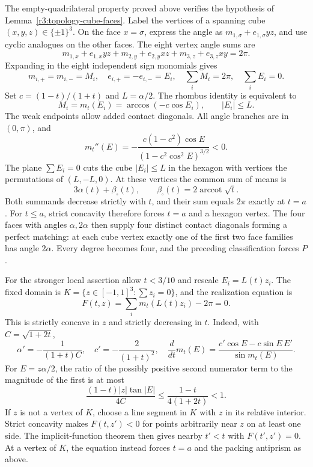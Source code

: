 \documentclass[12pt,reqno]{amsart}
\theoremstyle{definition}
\numberwithin{equation}{section}
\begin{document}
The empty-quadrilateral property proved above verifies the hypothesis
of Lemma~\ref{r3:topology-cube-faces}. Label the vertices of a spanning cube $(x,y,z)\in\{\pm1\}^3$. On the face
$x=\sigma$, express the angle as $m_{1,\sigma}+e_{1,\sigma}yz$, and use
cyclic analogues on the other faces. The eight vertex angle sums are
\[
 m_{1,x}+e_{1,x}yz+m_{2,y}+e_{2,y}xz+m_{3,z}+e_{3,z}xy=2\pi.
\]
Expanding in the eight independent sign monomials gives
\[
 m_{i,+}=m_{i,-}=M_i,\quad e_{i,+}=-e_{i,-}=E_i,\quad
 \sum_iM_i=2\pi,\quad\sum_iE_i=0.
\]
Set $c=(1-t)/(1+t)$ and $L=\alpha/2$. The rhombus identity is equivalent to
\[
 M_i=m_t(E_i)=\arccos(-c\cos E_i),\qquad |E_i|\le L.
\]
The weak endpoints allow added contact diagonals. All angle branches are
in $(0,\pi)$, and
\[
 m_t''(E)=-\frac{c(1-c^2)\cos E}{(1-c^2\cos^2E)^{3/2}}<0.
\]
The plane $\sum E_i=0$ cuts the cube $|E_i|\le L$ in the hexagon with
vertices the permutations of $(L,-L,0)$. At these vertices the common
sum of means is
\[
 3\alpha(t)+\beta_{\square}(t),\qquad
 \beta_{\square}(t)=2\operatorname{arccot}\sqrt t.
\]
Both summands decrease strictly with $t$, and their sum equals $2\pi$
exactly at $t=a$. For $t\le a$, strict concavity therefore forces $t=a$
and a hexagon vertex. The four faces with angles $\alpha,2\alpha$
then supply four distinct contact diagonals forming a perfect matching:
at each cube vertex exactly one of the first two face families has angle
$2\alpha$. Every degree becomes four, and the preceding classification
forces $P$.

For the stronger local assertion allow $t<3/10$ and rescale $E_i=L(t)z_i$.
The fixed domain is $K=\{z\in[-1,1]^3:\sum z_i=0\}$, and the realization
equation is
\[
 F(t,z)=\sum_i m_t(L(t)z_i)-2\pi=0.
\]
This is strictly concave in $z$ and strictly decreasing in $t$. Indeed,
with $C=\sqrt{1+2t}$,
\[
 \alpha'=-\frac1{(1+t)C},\quad c'=-\frac2{(1+t)^2},\quad
 \frac{d}{dt}m_t(E)=\frac{c'\cos E-c\sin E\,E'}{\sin m_t(E)}.
\]
For $E=z\alpha/2$, the ratio of the possibly positive second numerator
term to the magnitude of the first is at most
\[
 \frac{(1-t)|z|\tan|E|}{4C}
 \le\frac{1-t}{4(1+2t)}<1.
\]
If $z$ is not a vertex of $K$, choose a line segment in $K$ with $z$ in
its relative interior. Strict concavity makes $F(t,z')<0$ for points
arbitrarily near $z$ on at least one side. The implicit-function theorem
then gives nearby $t'<t$ with $F(t',z')=0$. At a vertex of $K$, the equation
instead forces $t=a$ and the packing antiprism as above.
\end{document}

